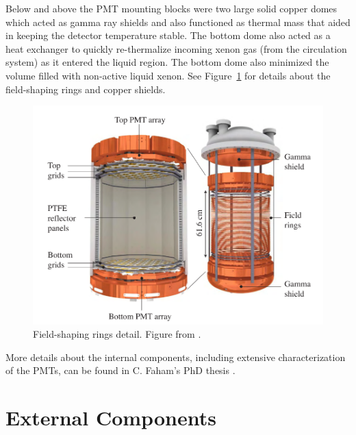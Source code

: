 Below and above the \ac{PMT} mounting blocks were two large solid copper domes which acted as gamma ray shields and also functioned as thermal mass that aided in keeping the detector temperature stable. The bottom dome also acted as a heat exchanger to quickly re-thermalize incoming xenon gas (from the circulation system) as it entered the liquid region. The bottom dome also minimized the volume filled with non-active liquid xenon. See Figure~\ref{fig:lux2} for details about the field-shaping rings and copper shields.

\begin{figure}[htbp]
\begin{center}
\includegraphics[width=\textwidth]{figures/lux/lux_inner2.png}
\caption{Field-shaping rings detail. Figure from \cite{LUXDetectorPaper}. }
\label{fig:lux2}
\end{center}
\end{figure}


More details about the internal components, including extensive characterization of the \ac{PMT}s, can be found in C. Faham's PhD thesis \cite{Faham2014a}.

\section{External Components}

